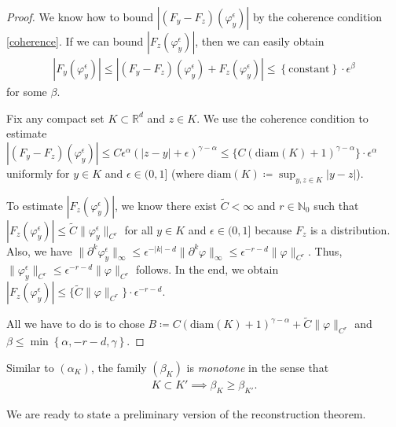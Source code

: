 \begin{proof}
    We know how to bound $|(F_y - F_z)(\varphi^\epsilon_y)|$ by the coherence condition \eqref{coherence}. If we can bound $|F_z(\varphi^\epsilon_y)|$, then we can easily obtain 
    \begin{align*}
        |F_y(\varphi^\epsilon_y)| \leq |(F_y - F_z)(\varphi^\epsilon_y) + F_z(\varphi^\epsilon_y)| \leq \left\{ \mathrm{constant} \right\} \cdot \epsilon^{\beta}
    \end{align*}
    for some $\beta$.
    
    Fix any compact set $K \subset \mathbb{R}^d$ and $z \in K$. We use the coherence condition to estimate $|(F_y - F_z)(\varphi^\epsilon_y)| \leq  C \epsilon^{\alpha}(|z-y|+\epsilon)^{\gamma - \alpha} \leq \{ C (\mathrm{diam}(K) + 1)^{\gamma - \alpha} \} \cdot  \epsilon^{\alpha}$ uniformly for $y \in K$ and $\epsilon \in (0,1]$ (where $\mathrm{diam}(K) \coloneqq \sup_{y,z \in K}|y-z| $).

    To estimate $|F_z(\varphi^\epsilon_y)|$, we know there exist $\tilde C < \infty$ and $r \in \mathbb{N}_0$ such that $|F_z(\varphi^\epsilon_y)| \leq \tilde C \lVert \varphi^\epsilon_y \rVert_{C^r}$ for all $y \in K$ and $\epsilon \in (0,1]$ because $F_z$ is a distribution. Also, we have $\lVert \partial^k\varphi^\epsilon_y \rVert_\infty \leq \epsilon^{-|k|- d} \lVert \partial^k\varphi \rVert_\infty \leq \epsilon^{-r - d} \lVert \varphi \rVert_{C^r}$. Thus, $\lVert \varphi^\epsilon_y \rVert_{C^r} \leq \epsilon^{-r-d}\lVert \varphi \rVert_{C^r}$ follows. In the end, we obtain 
    $|F_z(\varphi^\epsilon_y)| \leq \{ \tilde C  \lVert \varphi \rVert_{C^r}  \} \cdot \epsilon^{-r-d}$.

    All we have to do is to chose $B \coloneqq C (\mathrm{diam}(K) + 1)^{\gamma - \alpha} +  \tilde C  \lVert \varphi \rVert_{C^r}  $ and $\beta \leq \min \left\{ \alpha, -r-d, \gamma \right\}$.
\end{proof}

Similar to $(\alpha_K)$, the family $(\beta_K)$ is \emph{monotone} in the sense that 
\begin{align}\label{beta-monotone}
    K \subset K' \implies \beta_K \geq \beta_{K'}.
\end{align} 


We are ready to state a preliminary version of the reconstruction theorem. 

